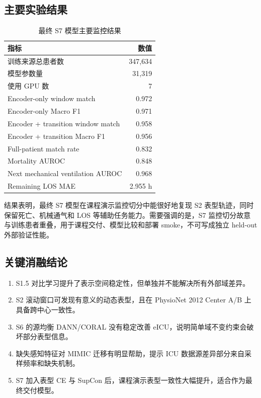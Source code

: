 \documentclass[11pt,a4paper]{article}
\newcommand{\reporttablesize}{\small}
\begin{document}
\subsection{主要实验结果}
\begin{table}[H]
\centering
\caption{最终 S7 模型主要监控结果}
\label{tab:s7-results}
\reporttablesize
\setlength{\tabcolsep}{8pt}
\renewcommand{\arraystretch}{1.12}
\begin{tabular}{@{}lr@{}}
\toprule
指标 & 数值\\
\midrule
训练来源总患者数 & 347,634\\
模型参数量 & 31,319\\
使用 GPU 数 & 7\\
Encoder-only window match & 0.972\\
Encoder-only Macro F1 & 0.971\\
Encoder + transition window match & 0.958\\
Encoder + transition Macro F1 & 0.956\\
Full-patient match rate & 0.832\\
Mortality AUROC & 0.848\\
Next mechanical ventilation AUROC & 0.968\\
Remaining LOS MAE & 2.955 h\\
\bottomrule
\end{tabular}
\end{table}

结果表明，最终 S7 模型在课程演示监控切分中能很好地复现 S2 表型轨迹，同时保留死亡、机械通气和 LOS 等辅助任务能力。需要强调的是，S7 监控切分故意与训练患者重叠，用于课程交付、模型比较和部署 smoke，不可写成独立 held-out 外部验证性能。

\subsection{关键消融结论}
\begin{enumerate}[leftmargin=*,itemsep=1pt]
  \item S1.5 对比学习提升了表示空间稳定性，但单独并不能解决所有外部域差异。
  \item S2 滚动窗口可发现有意义的动态表型，且在 PhysioNet 2012 Center A/B 上具备跨中心一致性。
  \item S6 的源均衡 DANN/CORAL 没有稳定改善 eICU，说明简单域不变约束会破坏部分表型信息。
  \item 缺失感知特征对 MIMIC 迁移有明显帮助，提示 ICU 数据源差异部分来自采样频率和缺失机制。
  \item S7 加入表型 CE 与 SupCon 后，课程演示表型一致性大幅提升，适合作为最终交付模型。
\end{enumerate}
\end{document}
